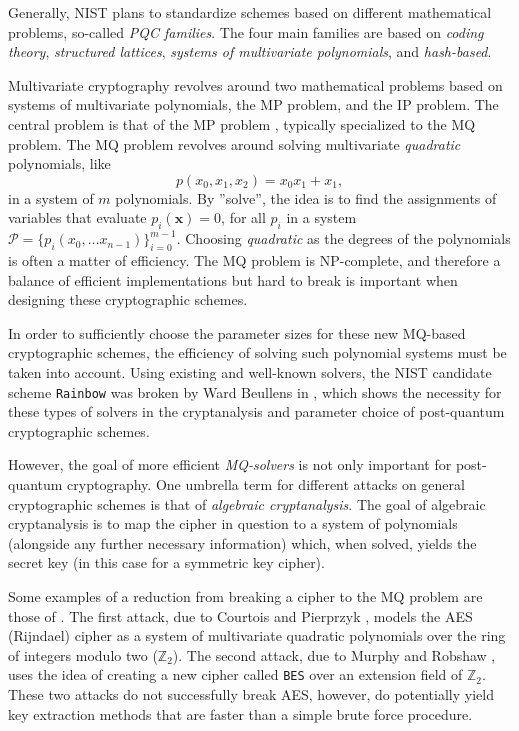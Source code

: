 Generally, NIST plans to standardize schemes based on different mathematical problems, so-called \textit{PQC families}. The four main families are based on \textit{coding theory}, \textit{structured lattices}, \textit{systems of multivariate polynomials}, and \textit{hash-based}.

Multivariate cryptography revolves around two mathematical problems based on systems of multivariate polynomials, the MP problem, and the IP problem. The central problem is that of the MP problem \cite{ding2020}, typically specialized to the MQ problem. The MQ problem revolves around solving multivariate \textit{quadratic} polynomials, like 
$$
    p(x_0,x_1,x_2) = x_0x_1 + x_1,
$$
in a system of $m$ polynomials. By ''solve'', the idea is to find the assignments of variables that evaluate $p_i(\mathbf{x}) = 0$, for all $p_i$ in a system $\mathcal{P} = \{p_i(x_{0}, \dots x_{n - 1})\}_{i = 0}^{m - 1}$. Choosing \textit{quadratic} as the degrees of the polynomials is often a matter of efficiency. The MQ problem is NP-complete, and therefore a balance of efficient implementations but hard to break is important when designing these cryptographic schemes.

In order to sufficiently choose the parameter sizes for these new MQ-based cryptographic schemes, the efficiency of solving such polynomial systems must be taken into account. Using existing and well-known solvers, the NIST candidate scheme \texttt{Rainbow} was broken by Ward Beullens in \cite{crypto-2022-32130}, which shows the necessity for these types of solvers in the cryptanalysis and parameter choice of post-quantum cryptographic schemes.

However, the goal of more efficient \textit{MQ-solvers} is not only important for post-quantum cryptography. One umbrella term for different attacks on general cryptographic schemes is that of \textit{algebraic cryptanalysis}. The goal of algebraic cryptanalysis is to map the cipher in question to a system of polynomials (alongside any further necessary information) which, when solved, yields the secret key (in this case for a symmetric key cipher).

Some examples of a reduction from breaking a cipher to the MQ problem are those of \cite{nover2005algebraic}. The first attack, due to Courtois and Pierprzyk \cite{courtois2002cryptanalysis}, models the AES (Rijndael) cipher as a system of multivariate quadratic polynomials over the ring of integers modulo two ($\mathbb{Z}_2$). The second attack, due to Murphy and Robshaw \cite{crypto-2002-1565}, uses the idea of creating a new cipher called \texttt{BES} over an extension field of $\mathbb{Z}_2$. These two attacks do not successfully break AES, however, do potentially yield key extraction methods that are faster than a simple brute force procedure.

